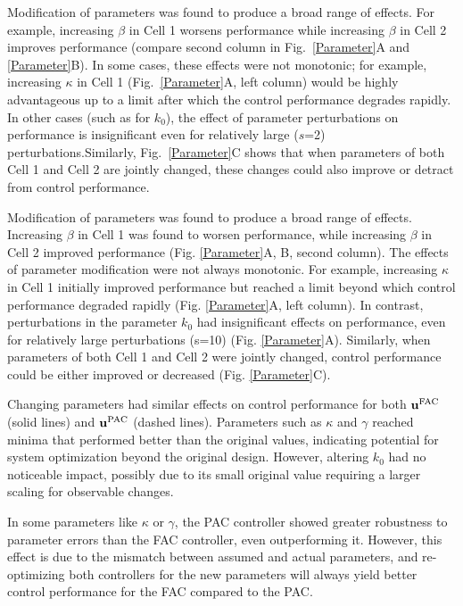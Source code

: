 \documentclass[12pt]{article}
\begin{document}
Modification of parameters was found to produce a broad range of effects. For example, increasing $\beta$ in Cell 1 worsens performance while increasing $\beta$ in Cell 2 improves performance (compare second column in Fig.\ \ref{Parameter}A and \ref{Parameter}B). In some cases, these effects were not monotonic; for example, increasing $\kappa$ in Cell 1 (Fig.\ \ref{Parameter}A, left column) would be highly advantageous up to a limit after which the control performance degrades rapidly. In other cases (such as for $k_0$), the effect of parameter perturbations on performance is insignificant even for relatively large ($s$=2) perturbations.Similarly, Fig.\ \ref{Parameter}C shows that when parameters of both Cell 1 and Cell 2 are jointly changed, these changes could also improve or detract from control performance.

Modification of parameters was found to produce a broad range of effects. Increasing $\beta$ in Cell 1 was found to worsen performance, while increasing $\beta$ in Cell 2 improved performance (Fig. \ref{Parameter}A, B, second column). The effects of parameter modification were not always monotonic. For example, increasing $\kappa$ in Cell 1 initially improved performance but reached a limit beyond which control performance degraded rapidly (Fig. \ref{Parameter}A, left column). In contrast, perturbations in the parameter $k_0$ had insignificant effects on performance, even for relatively large perturbations (s=10) (Fig. \ref{Parameter}A). Similarly, when parameters of both Cell 1 and Cell 2 were jointly changed, control performance could be either improved or decreased (Fig. \ref{Parameter}C).


Changing parameters had similar effects on control performance for both $\mathbf{u}^{\rm FAC}$ (solid lines) and $\mathbf{u}^{\rm PAC}$ (dashed lines). Parameters such as $\kappa$ and $\gamma$ reached minima that performed better than the original values, indicating potential for system optimization beyond the original design. However, altering $k_0$ had no noticeable impact, possibly due to its small original value requiring a larger scaling for observable changes.

In some parameters like $\kappa$ or $\gamma$, the PAC controller showed greater robustness to parameter errors than the FAC controller, even outperforming it. However, this effect is due to the mismatch between assumed and actual parameters, and re-optimizing both controllers for the new parameters will always yield better control performance for the FAC compared to the PAC.
\end{document}
